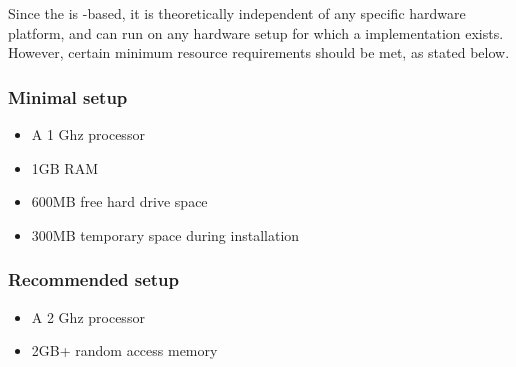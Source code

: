 Since the \ite{} is -based, it is theoretically independent of any specific hardware platform, and can run on any hardware setup for which a  implementation exists. However, certain minimum resource requirements should be met, as stated below.

\subsubsection{Minimal setup}
\begin{itemize}
\item A 1 Ghz processor
\item 1GB RAM
\item 600MB free hard drive space
\item 300MB temporary space during installation
\end{itemize}
\subsubsection{Recommended setup}
\begin{itemize}
\item A 2 Ghz processor
\item 2GB+ random access memory

\end{itemize}

